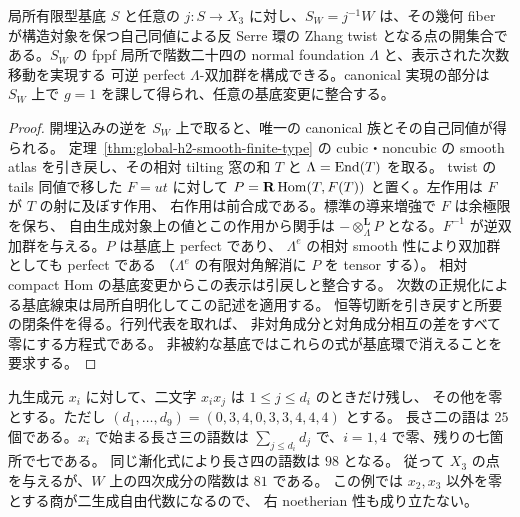 \begin{corollary}[任意の関係式族への適用]
\label{cor:x3-foundation-neighborhood}
局所有限型基底 $S$ と任意の $j:S\to X_3$ に対し、$S_W=j^{-1}W$
は、その幾何 fiber が構造対象を保つ自己同値による反 Serre 環の
Zhang twist となる点の開集合である。$S_W$ の fppf 局所で階数二十四の
normal foundation $\Lambda$ と、表示された次数移動を実現する
可逆 perfect $\Lambda$-双加群を構成できる。canonical 実現の部分は
$S_W$ 上で $g=1$ を課して得られ、任意の基底変更に整合する。
\end{corollary}
\begin{proof}
開埋込みの逆を $S_W$ 上で取ると、唯一の canonical 族とその自己同値が得られる。
定理~\ref{thm:global-h2-smooth-finite-type} の cubic・noncubic の
smooth atlas を引き戻し、その相対 tilting 窓の和 $T$ と $\Lambda=\operatorname{End}(T)$ を取る。
twist の tails 同値で移した $F=ut$ に対して
$P=\mathbf R\operatorname{Hom}(T,F(T))$ と置く。左作用は $F$ が $T$ の射に及ぼす作用、
右作用は前合成である。標準の導来増強で $F$ は余極限を保ち、
自由生成対象上の値とこの作用から関手は $-\otimes_\Lambda^{\mathbf L}P$
となる。$F^{-1}$ が逆双加群を与える。$P$ は基底上 perfect であり、
$\Lambda^e$ の相対 smooth 性により双加群としても perfect である
（$\Lambda^e$ の有限対角解消に $P$ を tensor する）。
相対 compact Hom の基底変更からこの表示は引戻しと整合する。
次数の正規化による基底線束は局所自明化してこの記述を適用する。
恒等切断を引き戻すと所要の閉条件を得る。行列代表を取れば、
非対角成分と対角成分相互の差をすべて零にする方程式である。
非被約な基底ではこれらの式が基底環で消えることを要求する。
\end{proof}

\begin{example}[$W$ の外の三次表示]
九生成元 $x_i$ に対して、二文字 $x_ix_j$ は $1\le j\le d_i$ のときだけ残し、
その他を零とする。ただし $(d_1,\ldots,d_9)=(0,3,4,0,3,3,4,4,4)$ とする。
長さ二の語は $25$ 個である。$x_i$ で始まる長さ三の語数は
$\sum_{j\le d_i}d_j$ で、$i=1,4$ で零、残りの七箇所で七である。
同じ漸化式により長さ四の語数は $98$ となる。
従って $X_3$ の点を与えるが、$W$ 上の四次成分の階数は $81$ である。
この例では $x_2,x_3$ 以外を零とする商が二生成自由代数になるので、
右 noetherian 性も成り立たない。
\end{example}
